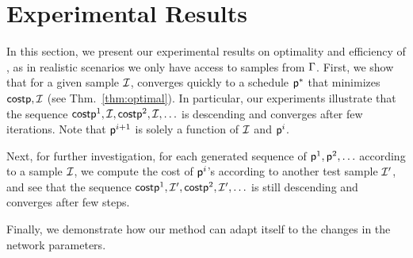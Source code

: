 \section{Experimental Results}\label{sec:exp}
In this section, we present our experimental results on optimality and
efficiency of \algonameapx, as in realistic scenarios we only have access to
samples from $\Gamma$. First, we show that for a given sample $\mathcal{I}$,
\algonameapx 
converges quickly to a schedule $\mathsf{p}^*$ that minimizes $\mathsf{cost}{\mathsf{p},
\mathcal{I}}$ (see Thm.~\ref{thm:optimal}). In particular, our experiments
illustrate that the sequence $\mathsf{cost}{\mathsf{p}^1,\mathcal{I}}, \mathsf{cost}{\mathsf{p}^2, \mathcal{I}},
\ldots$ is descending and converges after few iterations.  Note that
$\mathsf{p}^{i+1}$ is solely a function of $\mathcal{I}$ and $\mathsf{p}^i$. 

Next, for further investigation, for each generated sequence of
$\mathsf{p}^1,\mathsf{p}^2,\ldots$ according to a sample $\mathcal{I}$, we compute the cost
of $\mathsf{p}^i$'s according to another test sample $\mathcal{I}'$, and see that the
sequence $\mathsf{cost}{\mathsf{p}^1,\mathcal{I}'}, \mathsf{cost}{\mathsf{p}^2,\mathcal{I}'},\ldots$ is still
descending and converges after few steps.

Finally, we demonstrate how our method can adapt itself to the changes in the network parameters.



